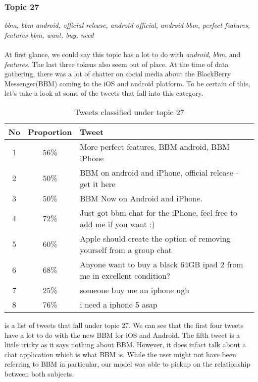 \subsubsection{Topic 27}
\label{sec:topic_27}
\textit{bbm, bbm android, official release, android official, android bbm, perfect features, features bbm,
want, buy, need} \\\\
At first glance, we could say this topic has a lot to do with \textit{android}, \textit{bbm}, and
\textit{features}. The last three tokens also seem out of place. At the time of data gathering,
there was a lot of chatter on social media about the BlackBerry Messenger(BBM) coming to the iOS and
android platform. To be certain of this, let's take a look at some of the tweets that fall into this
category.\\

\begin{table}[H]
  \begin{tabular}{c c p{13cm}} \toprule
    No & Proportion & Tweet \\ \midrule
    1 & 56\% & More perfect features, BBM android, BBM iPhone \\ \midrule
    2 & 50\% & BBM on android and iPhone, official release - get it here \\ \midrule
    3 & 50\% & BBM Now on Android and iPhone. \\ \midrule
    4 & 72\% & Just got bbm chat for the iPhone, feel free to add me if you want :) \\ \midrule
    5 & 60\% & Apple should create the option of removing yourself from a group chat \\ \midrule
    6 & 68\% & Anyone want to buy a black 64GB ipad 2 from me in excellent condition? \\ \midrule
    7 & 25\% & someone buy me an iphone ugh \\ \midrule
    8 & 76\% & i need a iphone 5 asap \\ \bottomrule
  \end{tabular}
  \caption{Tweets classified under topic 27}
  \label{tab:tweets_under_27}
\end{table}

 is a list of tweets that fall under topic 27. We can see that the
first four tweets have a lot to do with the new BBM for iOS and Android. The fifth tweet is a little
tricky as it says nothing about BBM\@. However, it does infact talk about a chat application which is
what BBM is. While the user might not have been referring to BBM in particular, our model was able
to pickup on the relationship between both subjects.

